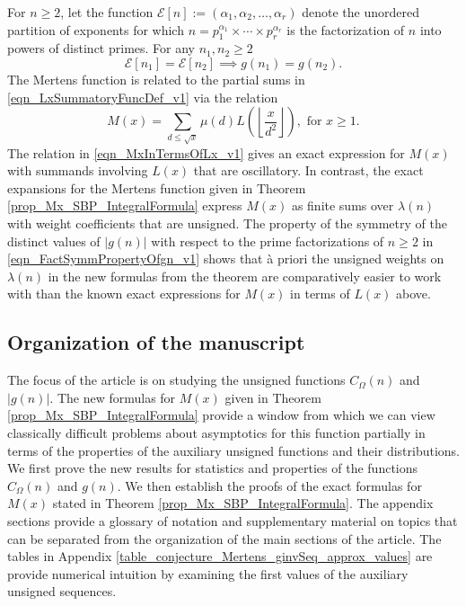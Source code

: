 \documentclass[11pt,reqno,a4letter]{article}
\newcommand{\hlocalref}[1]{\hyperref[#1]{\ref{#1}}}
\numberwithin{equation}{section}
\numberwithin{figure}{section}
\numberwithin{table}{section}
\newcommand{\Floor}[2]{\ensuremath{\left\lfloor \frac{#1}{#2} \right\rfloor}}
\theoremstyle{plain}
\numberwithin{theorem}{section}
\theoremstyle{definition}
\begin{document}
For $n \geq 2$, let the function 
$\mathcal{E}[n] := (\alpha_1, \alpha_2, \ldots, \alpha_r)$ denote the unordered 
partition of exponents for which 
$n = p_1^{\alpha_1} \times \cdots \times p_r^{\alpha_r}$ is the factorization of 
$n$ into powers of distinct primes. 
For any $n_1,n_2 \geq 2$ 
\begin{equation}
\label{eqn_FactSymmPropertyOfgn_v1} 
\mathcal{E}[n_1] = \mathcal{E}[n_2] \implies g(n_1) = g(n_2). 
\end{equation}
The Mertens function is related to the partial sums in 
\eqref{eqn_LxSummatoryFuncDef_v1} 
via the relation \cite{HUMPHRIES-JNT-2013,LEHMAN-1960} 
\begin{equation}
\label{eqn_MxInTermsOfLx_v1} 
M(x) = \sum_{d \leq \sqrt{x}} \mu(d) L\left(\Floor{x}{d^2}\right), \text{ for } x \geq 1.
\end{equation}
The relation in \eqref{eqn_MxInTermsOfLx_v1} 
gives an exact expression for $M(x)$ with summands involving $L(x)$ that are oscillatory. 
In contrast, the exact expansions for the Mertens function given in 
Theorem \hlocalref{prop_Mx_SBP_IntegralFormula} 
express $M(x)$ as finite sums over $\lambda(n)$ with weight coefficients that are unsigned. 
The property of the symmetry of the distinct values of $|g(n)|$ with respect to the 
prime factorizations of $n \geq 2$ in \eqref{eqn_FactSymmPropertyOfgn_v1} 
shows that \`{a} priori the unsigned weights on $\lambda(n)$ in 
the new formulas from the theorem are comparatively easier to work with than the known 
exact expressions for $M(x)$ in terms of $L(x)$ above.

\subsection{Organization of the manuscript}

The focus of the article is on studying the unsigned functions 
$C_{\Omega}(n)$ and $|g(n)|$. 
The new formulas for $M(x)$ given in 
Theorem \hlocalref{prop_Mx_SBP_IntegralFormula} 
provide a window from which we can view classically  
difficult problems about asymptotics for this function partially in terms of the 
properties of the auxiliary unsigned functions and their distributions. 
We first prove the new results for statistics and properties of the functions 
$C_{\Omega}(n)$ and $g(n)$. We then establish the proofs of the 
exact formulas for $M(x)$ stated in 
Theorem \hlocalref{prop_Mx_SBP_IntegralFormula}. 
The appendix sections provide a glossary of notation and 
supplementary material on topics that can be separated from the 
organization of the main sections of the article. 
The tables in Appendix \hlocalref{table_conjecture_Mertens_ginvSeq_approx_values} are 
provide numerical intuition by examining the first values of the 
auxiliary unsigned sequences.
\end{document}
